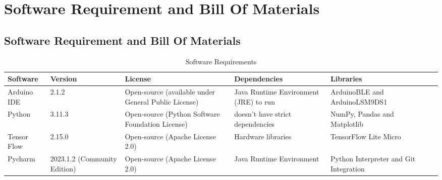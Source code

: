 %
%
%




\chapter{Software Requirement and Bill Of Materials}
\section{Software Requirement and Bill Of Materials }

\begin{table}[H]
	
	\begin{tabular}{||m{1.6cm}|m{1.3cm}|m{3.5cm}|m{2.7cm}|m{2.1cm}|m{3cm}|m||}
		
		\hline
		
		\textbf{Software} & \textbf{Version} & \textbf{License}& \textbf{Dependencies}  & \textbf{Libraries}  \\
		
		\hline
		
		Arduino IDE & 2.1.2 &  Open-source (available under General Public License)& Java Runtime Environment (JRE) to run  &  ArduinoBLE and ArduinoLSM9DS1 \\
		
		
		\hline
		
		Python  & 3.11.3 & Open-source (Python Software Foundation License) & doesn't have strict dependencies & NumPy, Pandas and Matplotlib \\
		
		\hline
		
		Tensor Flow & 2.15.0 & Open-source (Apache License 2.0) & Hardware libraries  &  TensorFlow Lite Micro \\
		
		\hline
		
		Pycharm  & 2023.1.2 (Community Edition) & Open-source (Apache License 2.0) & Java Runtime Environment  & Python Interpreter and Git Integration \\
		
		\hline
		
	\end{tabular}
	
	\caption {Software Requirements}
	\label{Table 5.2}
\end{table}

